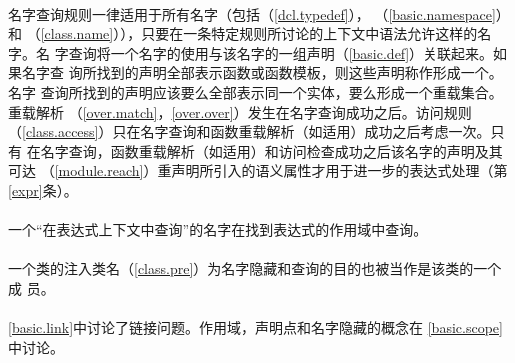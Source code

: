 \paragraph{} %
名字查询规则一律适用于所有名字（包括（\ref{dcl.typedef}），
（\ref{basic.namespace}）和
（\ref{class.name}）），只要在一条特定规则所讨论的上下文中语法允许这样的名字。名
字查询将一个名字的使用与该名字的一组声明（\ref{basic.def}）关联起来。如果名字查
询所找到的声明全部表示函数或函数模板，则这些声明称作形成一个。名字
查询所找到的声明应该要么全部表示同一个实体，要么形成一个重载集合。重载解析
（\ref{over.match}，\ref{over.over}）发生在名字查询成功之后。访问规则
（\ref{class.access}）只在名字查询和函数重载解析（如适用）成功之后考虑一次。只有
在名字查询，函数重载解析（如适用）和访问检查成功之后该名字的声明及其可达
（\ref{module.reach}）重声明所引入的语义属性才用于进一步的表达式处理（第
\ref{expr}条）。

\paragraph{} %
一个“在表达式上下文中查询”的名字在找到表达式的作用域中查询。

\paragraph{} %
一个类的注入类名（\ref{class.pre}）为名字隐藏和查询的目的也被当作是该类的一个成
员。

\paragraph{} %
\begin{note}
  \ref{basic.link}中讨论了链接问题。作用域，声明点和名字隐藏的概念在
  \ref{basic.scope}中讨论。
\end{note}
